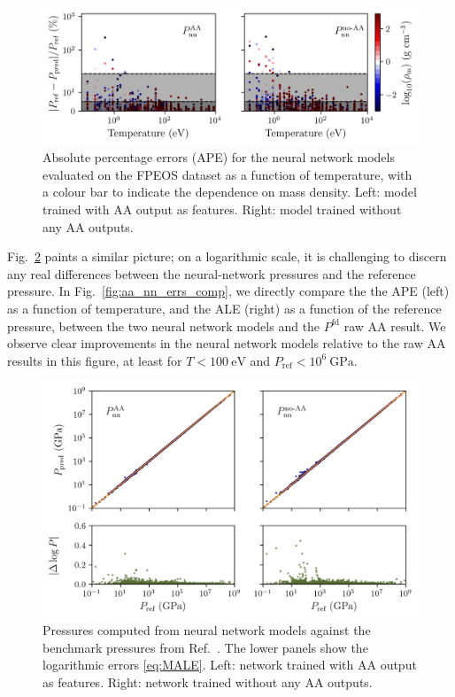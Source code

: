 \documentclass[%
 preprint,
 superscriptaddress,
 amsmath,amssymb,
longbibliography,
]{revtex4-2}
\newcommand{\Pref}{P_\textrm{ref}}
\newcommand{\Pfd}{P^\textrm{fd}}
\begin{document}
\begin{figure}
    \centering
    \includegraphics{../figs/error_temp_nn.png}
    \caption{Absolute percentage errors (APE) for the neural network models evaluated on the FPEOS dataset \cite{Militzer_EOS_database} as a function of temperature, with a colour bar to indicate the dependence on mass density. Left: model trained with AA output as features. Right: model trained without any AA outputs.}
    \label{fig:nn_error_temp}
\end{figure}

Fig.~\ref{fig:nn_error_log} paints a similar picture; on a logarithmic scale, it is challenging to discern any real differences between the neural-network pressures and the reference pressure. In Fig.~\ref{fig:aa_nn_errs_comp}, we directly compare the the APE (left) as a function of temperature, and the ALE (right) as a function of the reference pressure, between the two neural network models and the $\Pfd$ raw AA result. We observe clear improvements in the neural network models relative to the raw AA results in this figure, at least for $T<100\ \textrm{eV}$ and $\Pref<10^6\ \textrm{GPa}$. 

\begin{figure}
    \centering
    \includegraphics{../figs/nn_log_errs.png}
    \caption{Pressures computed from neural network models against the benchmark pressures from Ref.~\cite{Militzer_EOS_database}. The lower panels show the logarithmic errors \eqref{eq:MALE}. Left: network trained with AA output as features. Right: network trained without any AA outputs.}
    \label{fig:nn_error_log}
\end{figure}
\end{document}
